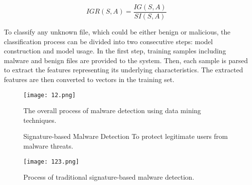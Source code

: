 \documentclass[a4paper, 12pt, oneside]{Thesis}
\begin{document}
\begin{equation}
IGR(S, A) = \frac{IG(S, A)}{SI(S, A)}
\label{igr}
\end{equation}

To classify any unknown file, which could be either benign or malicious, the classification process can be divided into two consecutive steps: model construction and model usage. In the first step, training samples including malware and benign files are provided to the system. Then, each sample is parsed to extract the features representing its underlying characteristics. The extracted features are then converted to vectors in the training set.
\begin{figure}[ht]
    \centering
    \texttt{[image: 12.png]} 
    \caption{The overall process of malware detection using data mining techniques.}
    \label{sample_image}
\end{figure}
\begin{figure}[ht]
    \text Signature-based Malware Detection To protect legitimate users from malware threats.
    \par
    \centering
    \texttt{[image: 123.png]} 
    \caption{Process of traditional signature-based malware detection.}
    \label{sample_image1}
\end{figure}

\begin{table}[ht]
\centering
\caption{Summary of Some Typical Feature Extraction Methods in Malware Detection}
\label{feature_extraction_method}
\end{table}
\end{document}
